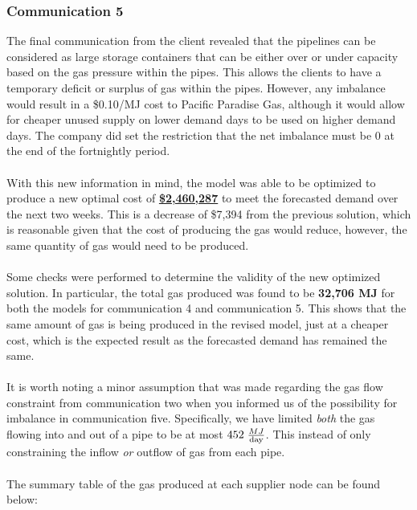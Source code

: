 \documentclass{article}
\begin{document}
\newpage
\subsubsection{Communication 5}
The final communication from the client revealed that the pipelines can be considered as large storage containers that can be either over or under capacity based on the gas pressure within the pipes. This allows the clients to have a temporary deficit or surplus of gas within the pipes. However, any imbalance would result in a \$0.10/MJ cost to Pacific Paradise Gas, although it would allow for cheaper unused supply on lower demand days to be used on higher demand days. The company did set the restriction that the net imbalance must be 0 at the end of the fortnightly period.\\
\\
With this new information in mind, the model was able to be optimized to produce a new optimal cost of \underline{\textbf{\$2,460,287}} to meet the forecasted demand over the next two weeks. This is a decrease of \$7,394 from the previous solution, which is reasonable given that the cost of producing the gas would reduce, however, the same quantity of gas would need to be produced.\\
\\
Some checks were performed to determine the validity of the new optimized solution. In particular, the total gas produced was found to be \textbf{32,706 MJ} for both the models for communication 4 and communication 5. This shows that the same amount of gas is being produced in the revised model, just at a cheaper cost, which is the expected result as the forecasted demand has remained the same.\\
\\
It is worth noting a minor assumption that was made regarding the gas flow constraint from communication two when you informed us of the possibility for imbalance in communication five. Specifically, we have limited \textit{both} the gas flowing into and out of a pipe to be at most \(452 \hspace{0.1cm}\frac{MJ}{\text{day}}\). This instead of only constraining the inflow \textit{or} outflow of gas from each pipe.\\
\\
The summary table of the gas produced at each supplier node can be found below:
\end{document}
